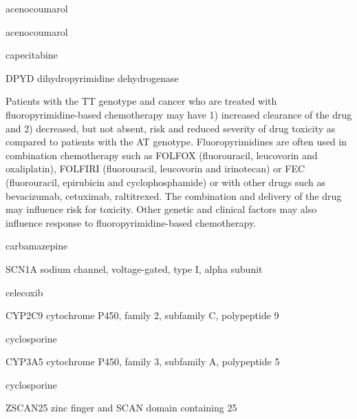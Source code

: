 \documentclass{resume} %
\begin{document}
\begin{rSection}{ acenocoumarol }
\begin{rSection}{ acenocoumarol }
\begin{rSection}{ capecitabine }
\begin{rSubsection}{ DPYD }{ dihydropyrimidine dehydrogenase }{}{}
\item[] Patients with the TT genotype and cancer who are treated with fluoropyrimidine-based chemotherapy may have 1) increased clearance of the drug and 2) decreased, but not absent, risk and reduced severity of drug toxicity as compared to patients with the AT genotype. Fluoropyrimidines are often used in combination chemotherapy such as FOLFOX (fluorouracil, leucovorin and oxaliplatin), FOLFIRI (fluorouracil, leucovorin and irinotecan) or FEC (fluorouracil, epirubicin and cyclophosphamide) or with other drugs such as bevacizumab, cetuximab, raltitrexed. The combination and delivery of the drug may influence risk for toxicity. Other genetic and clinical factors may also influence response to fluoropyrimidine-based chemotherapy.

\end{rSubsection}

\end{rSection}\begin{rSection}{ carbamazepine }
\item[]
\begin{rSubsection}{ SCN1A }{ sodium channel, voltage-gated, type I, alpha subunit }{}{}
\item[]


\end{rSubsection}

\end{rSection}\begin{rSection}{ celecoxib }
\item[]
\begin{rSubsection}{ CYP2C9 }{ cytochrome P450, family 2, subfamily C, polypeptide 9 }{}{}
\item[]


\end{rSubsection}

\end{rSection}\begin{rSection}{ cyclosporine }
\item[]
\begin{rSubsection}{ CYP3A5 }{ cytochrome P450, family 3, subfamily A, polypeptide 5 }{}{}
\item[]


\end{rSubsection}\begin{rSection}{ cyclosporine }
\item[]
\begin{rSubsection}{ ZSCAN25 }{ zinc finger and SCAN domain containing 25 }{}{}
\item[]



\end{rSubsection}
\end{rSection}
\end{rSection}
\end{rSection}
\end{rSection}
\end{document}
